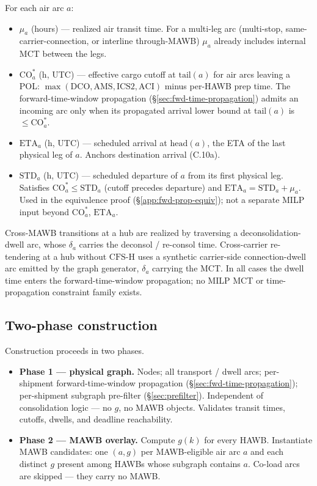 \documentclass[11pt,a4paper]{article}
\theoremstyle{definition}
\begin{document}
For each air arc $a$:
\begin{itemize}[noitemsep]
  \item $\mu_a$ (hours) --- realized air transit time. For a multi-leg arc
        (multi-stop, same-carrier-connection, or interline through-MAWB)
        $\mu_a$ already includes internal MCT between the legs.
  \item $\text{CO}_a^*$ (h, UTC) --- effective cargo cutoff at $\text{tail}(a)$
        for air arcs leaving a POL: $\max(\text{DCO}, \text{AMS}, \text{ICS2},
        \text{ACI})$ minus per-HAWB prep time. The forward-time-window
        propagation (\S\ref{sec:fwd-time-propagation}) admits an incoming arc
        only when its propagated arrival lower bound at $\text{tail}(a)$ is
        $\leq \text{CO}_a^*$.
  \item $\text{ETA}_a$ (h, UTC) --- scheduled arrival at $\text{head}(a)$, the
        ETA of the last physical leg of $a$. Anchors destination arrival
        (C.10a).
  \item $\text{STD}_a$ (h, UTC) --- scheduled departure of $a$ from its first
        physical leg. Satisfies $\text{CO}_a^* \leq \text{STD}_a$ (cutoff
        precedes departure) and $\text{ETA}_a = \text{STD}_a + \mu_a$. Used in
        the equivalence proof (\S\ref{app:fwd-prop-equiv}); not a separate MILP
        input beyond $\text{CO}_a^*$, $\text{ETA}_a$.
\end{itemize}
Cross-MAWB transitions at a hub are realized by traversing a
deconsolidation-dwell arc, whose $\delta_a$ carries the deconsol / re-consol
time. Cross-carrier re-tendering at a hub without $\text{CFS-H}$ uses a
synthetic carrier-side connection-dwell arc emitted by the graph generator,
$\delta_a$ carrying the MCT. In all cases the dwell time enters the
forward-time-window propagation; no MILP MCT or time-propagation constraint
family exists.

\subsection{Two-phase construction}

Construction proceeds in two phases.
\begin{itemize}[noitemsep]
  \item \textbf{Phase 1 --- physical graph.} Nodes; all transport / dwell arcs;
        per-shipment forward-time-window propagation
        (\S\ref{sec:fwd-time-propagation}); per-shipment subgraph pre-filter
        (\S\ref{sec:prefilter}). Independent of consolidation logic --- no
        $g$, no MAWB objects. Validates transit times, cutoffs, dwells, and
        deadline reachability.
  \item \textbf{Phase 2 --- MAWB overlay.} Compute $g(k)$ for every HAWB.
        Instantiate MAWB candidates: one $(a, g)$ per MAWB-eligible air arc
        $a$ and each distinct $g$ present among HAWBs whose subgraph contains
        $a$. Co-load arcs are skipped --- they carry no MAWB.
\end{itemize}
\end{document}
